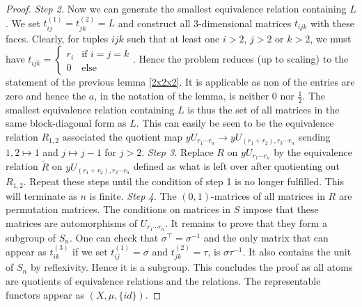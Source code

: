 \documentclass[a4paper]{amsproc}
\theoremstyle{plain}
\theoremstyle{definition}
\theoremstyle{remark}
\numberwithin{equation}{section}
\begin{document}
\begin{proof}
\emph{Step 2.} Now we can generate the smallest equivalence relation containing $L$. We set $t_{ij}^{(1)}=t^{(2)}_{jk}=L$ and construct all 3-dimensional matrices $t_{ijk}$ with these faces. Clearly, for tuples $ijk$ such that at least one $i>2$, $j>2$ or $k>2$, we must have $t_{ijk}=\begin{cases} r_i &\text{if }i=j=k \\ 0 &\text{else}  \end{cases}$. Hence the problem reduces (up to scaling) to the statement of the previous lemma \ref{2x2x2}. It is applicable as non of the entries are zero and hence the $a$, in the notation of the lemma, is neither $0$ nor $\frac{1}{2}$. The smallest equivalence relation containing $L$ is thus the set of all matrices in the same block-diagonal form as $L$. This can easily be seen to be the equivalence relation $R_{1,2}$ associated the quotient map  $yU_{r_1\cdots r_n}\rightarrow yU_{(r_1+r_2),r_3\cdots r_n}$ sending $1, 2\mapsto 1$ and $j\mapsto j-1$ for $j> 2$.
\newline
\newline
\emph{Step 3.} Replace $R$ on $yU_{r_1\cdots r_n}$ by  the equivalence relation $\tilde{R}$ on $yU_{(r_1+r_2),r_3\cdots r_n}$ defined as what is left over after quotienting out $R_{1,2}$. Repeat these steps until the condition of step 1 is no longer fulfilled. This will terminate as $n$ is finite.\newline
\newline
\emph{Step 4.} The $(0,1)$-matrices of all matrices in $R$ are permutation matrices. The conditions on matrices in $S$ impose that these matrices are automorphisms of $U_{r_1\cdots r_n}$. It remains to prove that they form a subgroup of $S_n$. One can check that $\sigma^\top=\sigma^{-1}$ and the only matrix that can appear as $t^{(3)}_{ik}$ if we set $t^{(1)}_{ij}=\sigma$ and $t^{(2)}_{jk}=\tau$, is $\sigma \tau^{-1}$. It also contains the unit of $S_n$ by reflexivity. Hence it is a subgroup.
\newline
\newline
This concludes the proof as all atoms are quotients of equivalence relations and the relations. The representable functors appear as $(X,\mu, \{id\})$.
\end{proof}
\end{document}
